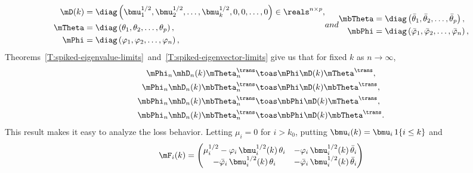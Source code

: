 \begin{subequations}
\begin{align}
    \mD(k) 
        &= 
            \diag\left( 
                \bmu_1^{1/2}, 
                \bmu_2^{1/2}, 
                \ldots,
                \bmu_k^{1/2},
                0,
                0,
                \ldots,
                0
            \right) \in \reals^{n \times p}, \\
    \mTheta
        &=
            \diag\left(
                \theta_1,
                \theta_2,
                \ldots,
                \theta_p
            \right), \\
    \mPhi
        &=
            \diag\left(
                \varphi_1,
                \varphi_2,
                \ldots,
                \varphi_n
            \right),
\end{align}
and
\begin{align}
    \mbTheta
        &=
            \diag\left(
                \bar \theta_1,
                \bar \theta_2,
                \ldots,
                \bar \theta_p
            \right), \\
    \mbPhi
        &=
            \diag\left(
                \bar \varphi_1,
                \bar \varphi_2,
                \ldots,
                \bar \varphi_n
            \right),
\end{align}
\end{subequations}
Theorems~\ref{T:spiked-eigenvalue-limits}~and~\ref{T:spiked-eigenvector-limits}
give us that for fixed $k$ as $n \to \infty$,
\begin{align*}
    \mPhi_n \mhD_n(k) \mTheta_n^\trans
        &\toas
            \mPhi \mD(k) \mTheta^\trans, \\
    \mPhi_n \mhD_n(k) \mbTheta_n^\trans
        &\toas
            \mPhi \mD(k) \mbTheta^\trans, \\
    \mbPhi_n \mhD_n(k) \mbTheta_n^\trans
        &\toas
            \mbPhi \mD(k) \mTheta^\trans, \\
    \mbPhi_n \mhD_n(k) \mbTheta_n^\trans
        &\toas
            \mbPhi \mD(k) \mbTheta^\trans.
\end{align*}
This result makes it easy to analyze the loss behavior.  Letting $\mu_i = 0$
for $i > k_0$, putting $\bmu_i(k) = \bmu_i \, 1\{i \leq k\}$ and
\begin{equation}
    \mF_i(k)
        =
            \left(
            \begin{matrix}
                \mu_i^{1/2} - \varphi_i \, \bmu_i^{1/2}(k) \, \theta_i &
                    -\varphi_i \, \bmu_i^{1/2}(k) \, \bar \theta_i \\
                -\bar \varphi_i \, \bmu_i^{1/2}(k) \, \theta_i &
                    -\bar \varphi_i \, \bmu_i^{1/2}(k) \, \bar \theta_i
            \end{matrix}
            \right)
\end{equation}
